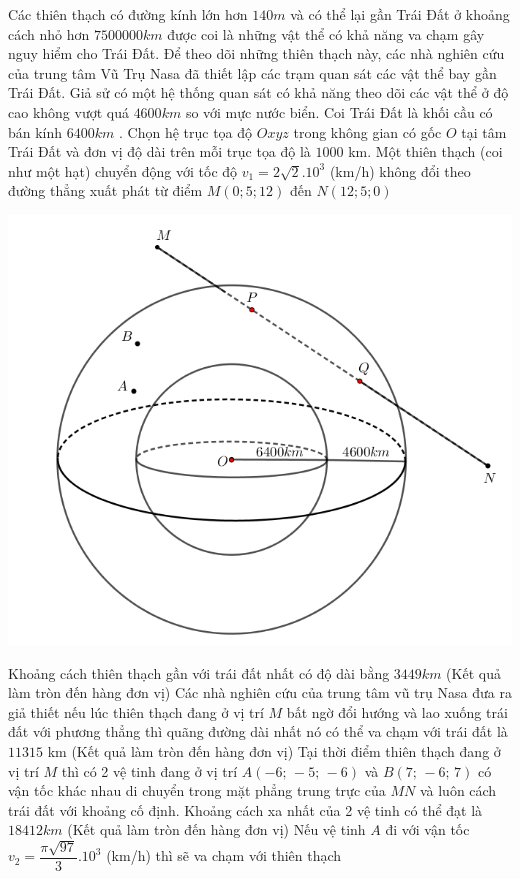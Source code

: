 \begin{ex}%
	Các thiên thạch có đường kính lớn hơn $140m$ và có thể lại gần Trái Đất ở khoảng cách nhỏ hơn $7500000km$ được coi là những vật thể có khả năng va chạm gây nguy hiểm cho Trái Đất. Để theo dõi những thiên thạch này, các nhà nghiên cứu của trung tâm Vũ Trụ Nasa đã thiết lập các trạm quan sát các vật thể bay gần Trái Đất. Giả sử có một hệ thống quan sát có khả năng theo dõi các vật thể ở độ cao không vượt quá $4600km$ so với mực nước biển. Coi Trái Đất là khối cầu có bán kính $6400km$ . Chọn hệ trục tọa độ $Oxyz$ trong không gian có gốc $O$ tại tâm Trái Đất và đơn vị độ dài trên mỗi trục tọa độ là $1000$ km. Một thiên thạch (coi như một hạt) chuyển động với tốc độ $v_1=2\sqrt{2}.10^3$ (km/h) không đổi theo đường thẳng xuất phát từ điểm $M\left(0;5;12\right)$ đến $N\left(12;5;0\right)$\\
	\centerline{\includegraphics[width=.4\textwidth]{images/2.16.png}}
	\choiceTF
	{\True Khoảng cách thiên thạch gần với trái đất nhất có độ dài bằng $3449km$ (Kết quả làm tròn đến hàng đơn vị)}
	{\True Các nhà nghiên cứu của trung tâm vũ trụ Nasa đưa ra giả thiết nếu lúc thiên thạch đang ở vị trí $M$ bất ngờ đổi hướng và lao xuống trái đất với phương thẳng thì quãng đường dài nhất nó có thể va chạm với trái đất là $11315$ km (Kết quả làm tròn đến hàng đơn vị)}
	{Tại thời điểm thiên thạch đang ở vị trí $M$ thì có 2 vệ tinh đang ở vị trí $A\left(-6;\,-5;\,-6\right)$ và $B\left(7;\,-6;\,7\right)$ có vận tốc khác nhau di chuyển trong mặt phẳng trung trực của $MN$ và luôn cách trái đất với khoảng cố định. Khoảng cách xa nhất của 2 vệ tinh có thể đạt là $18412km$ (Kết quả làm tròn đến hàng đơn vị)}
	{\True Nếu vệ tinh $A$ đi với vận tốc $v_2=\dfrac{\pi\sqrt{97}}{3}.10^3$ (km/h) thì sẽ va chạm với thiên thạch}
\end{ex}
